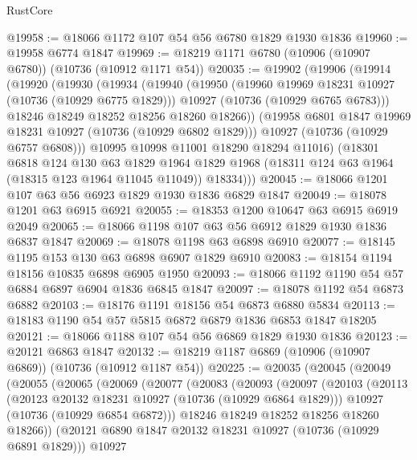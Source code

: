\begin{lexlean}{RustCore}
\begin{coremodule}
@19958 := @18066 @1172 @107 @54 @56 @6780 @1829 @1930 @1836
@19960 := @19958 @6774 @1847
@19969 := @18219 @1171 @6780 (@10906 (@10907 @6780)) (@10736 (@10912 @1171 @54))
@20035 := @19902
    (@19906
      (@19914
        (@19920
          (@19930
            (@19934
              (@19940
                (@19950
                  (@19960 @19969 @18231 @10927 (@10736 (@10929 @6775 @1829)))
                  @10927
                  (@10736 (@10929 @6765 @6783)))
                @18246
                @18249
                @18252
                @18256
                @18260
                @18266))
            (@19958 @6801 @1847 @19969 @18231 @10927 (@10736 (@10929 @6802 @1829)))
            @10927
            (@10736 (@10929 @6757 @6808)))
          @10995
          @10998
          @11001
          @18290
          @18294
          @11016)
        (@18301
          @6818
          @124
          @130
          @63
          @1829
          @1964
          @1829
          @1968
          (@18311 @124 @63 @1964 (@18315 @123 @1964 @11045 @11049))
          @18334)))
@20045 := @18066 @1201 @107 @63 @56 @6923 @1829 @1930 @1836 @6829 @1847
@20049 := @18078 @1201 @63 @6915 @6921
@20055 := @18353 @1200 @10647 @63 @6915 @6919 @2049
@20065 := @18066 @1198 @107 @63 @56 @6912 @1829 @1930 @1836 @6837 @1847
@20069 := @18078 @1198 @63 @6898 @6910
@20077 := @18145 @1195 @153 @130 @63 @6898 @6907 @1829 @6910
@20083 := @18154 @1194 @18156 @10835 @6898 @6905 @1950
@20093 := @18066 @1192 @1190 @54 @57 @6884 @6897 @6904 @1836 @6845 @1847
@20097 := @18078 @1192 @54 @6873 @6882
@20103 := @18176 @1191 @18156 @54 @6873 @6880 @5834
@20113 := @18183 @1190 @54 @57 @5815 @6872 @6879 @1836 @6853 @1847 @18205
@20121 := @18066 @1188 @107 @54 @56 @6869 @1829 @1930 @1836
@20123 := @20121 @6863 @1847
@20132 := @18219 @1187 @6869 (@10906 (@10907 @6869)) (@10736 (@10912 @1187 @54))
@20225 := @20035
    (@20045
      (@20049
        (@20055
          (@20065
            (@20069
              (@20077
                (@20083
                  (@20093
                    (@20097
                      (@20103
                        (@20113
                          (@20123 @20132 @18231 @10927 (@10736 (@10929 @6864 @1829)))
                          @10927
                          (@10736 (@10929 @6854 @6872)))
                        @18246
                        @18249
                        @18252
                        @18256
                        @18260
                        @18266))
                    (@20121 @6890 @1847 @20132 @18231 @10927 (@10736 (@10929 @6891 @1829)))
                    @10927

\end{coremodule}
\end{lexlean}
